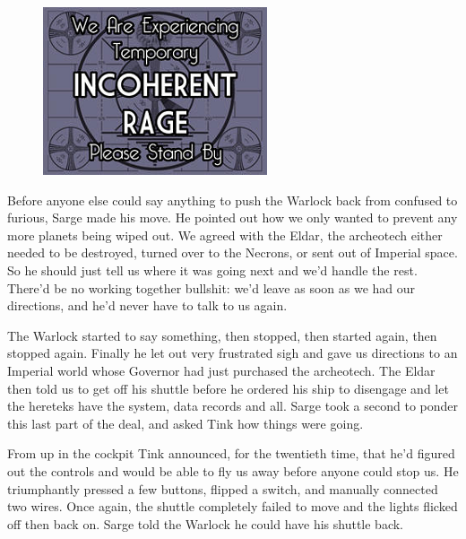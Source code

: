 \begin{figure}
	\begin{center}
		\includegraphics[width=\figwidth]{pics/11/62.png}
	\end{center}
\end{figure}
Before anyone else could say anything to push the Warlock back from confused to furious, Sarge made his move. 
He pointed out how we only wanted to prevent any more planets being wiped out. 
We agreed with the Eldar, the archeotech either needed to be destroyed, turned over to the Necrons, or sent out of Imperial space. 
So he should just tell us where it was going next and we'd handle the rest. 
There'd be no working together bullshit: 
we'd leave as soon as we had our directions, and he'd never have to talk to us again.

The Warlock started to say something, then stopped, then started again, then stopped again. 
Finally he let out very frustrated sigh and gave us directions to an Imperial world whose Governor had just purchased the archeotech. 
The Eldar then told us to get off his shuttle before he ordered his ship to disengage and let the hereteks have the system, data records and all. 
Sarge took a second to ponder this last part of the deal, and asked Tink how things were going.

From up in the cockpit Tink announced, for the twentieth time, that he'd figured out the controls and would be able to fly us away before anyone could stop us. 
He triumphantly pressed a few buttons, flipped a switch, and manually connected two wires. 
Once again, the shuttle completely failed to move and the lights flicked off then back on. 
Sarge told the Warlock he could have his shuttle back.

